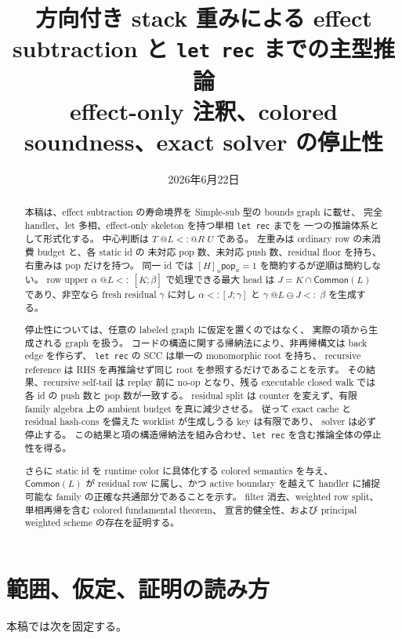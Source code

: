 \documentclass[uplatex,dvipdfmx,a4paper,10.5pt]{jsarticle}
\title{方向付き stack 重みによる effect subtraction と
\texttt{let rec} までの主型推論\\
\large effect-only 注釈、colored soundness、exact solver の停止性}
\author{}
\date{2026年6月22日}
\makeatletter
\theoremstyle{jpplain}
\newcommand{\Common}{\mathsf{Common}}
\newcommand{\takeop}[2]{[#1]_{#2}}
\newcommand{\popop}[1]{\mathsf{pop}_{#1}}
\newcommand{\row}[2]{[#1;#2]}
\newcommand{\wsub}[4]{#1\;@#2\mathrel{<:}@#3\;#4}
\newcommand{\lsub}[3]{#1\;@#2\mathrel{<:}\;#3}
\newcommand{\subty}[2]{#1\mathrel{<:}#2}
\makeatother
\begin{document}
\maketitle

\begin{abstract}
本稿は、effect subtraction の寿命境界を Simple-sub 型の bounds graph に載せ、
完全 handler、let 多相、effect-only skeleton を持つ単相 \texttt{let rec} までを
一つの推論体系として形式化する。
中心判断は $\wsub{T}{L}{R}{U}$ である。
左重みは ordinary row の未消費 budget と、各 static id の
未対応 pop 数、未対応 push 数、residual floor を持ち、右重みは pop だけを持つ。
同一 id では $\takeop{H}{u}\popop{u}=1$ を簡約するが逆順は簡約しない。
row upper $\lsub{\alpha}{L}{\row{K}{\beta}}$ で処理できる最大 head は
$J=K\cap\Common(L)$ であり、非空なら fresh residual $\gamma$ に対し
$\subty{\alpha}{\row{J}{\gamma}}$ と
$\lsub{\gamma}{L\ominus J}{\beta}$ を生成する。

停止性については、任意の labeled graph に仮定を置くのではなく、
実際の項から生成される graph を扱う。
コードの構造に関する帰納法により、非再帰構文は back edge を作らず、
\texttt{let rec} の SCC は単一の monomorphic root を持ち、
recursive reference は RHS を再推論せず同じ root を参照するだけであることを示す。
その結果、recursive self-tail は replay 前に no-op となり、残る executable closed walk では各 id の push 数と pop 数が一致する。
residual split は counter を変えず、有限 family algebra 上の ambient budget を真に減少させる。
従って exact cache と residual hash-cons を備えた worklist が生成しうる key は有限であり、
solver は必ず停止する。
この結果と項の構造帰納法を組み合わせ、\texttt{let rec} を含む推論全体の停止性を得る。

さらに static id を runtime color に具体化する colored semantics を与え、
$\Common(L)$ が residual row に属し、かつ active boundary を越えて handler に捕捉可能な
family の正確な共通部分であることを示す。
filter 消去、weighted row split、単相再帰を含む colored fundamental theorem、
宣言的健全性、および principal weighted scheme の存在を証明する。
\end{abstract}

\tableofcontents

\section{範囲、仮定、証明の読み方}

本稿では次を固定する。
\end{document}
